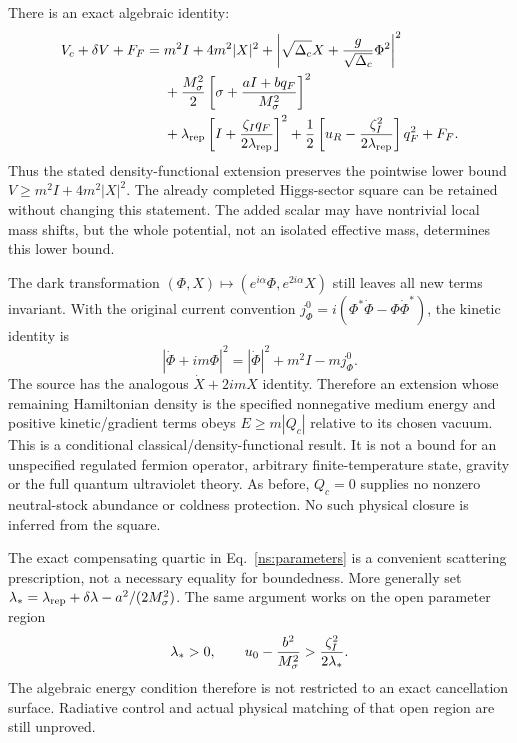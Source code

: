 \documentclass[11pt]{article}
\begin{document}
There is an exact algebraic identity:
\begin{align}
 V_c+\delta V+F_F={}&m^2I+4m^2|X|^2+
 \left|\sqrt{\Delta_c}X+{g\over\sqrt{\Delta_c}}\Phi^2\right|^2\\
 &+{M_\sigma^2\over2}
       \left[\sigma+{aI+bq_F\over M_\sigma^2}\right]^2\nonumber\\
 &+\lambda_{\rm rep}
       \left[I+{\zeta_Iq_F\over2\lambda_{\rm rep}}\right]^2
 +{1\over2}\left[u_R-{\zeta_I^2\over2\lambda_{\rm rep}}\right]q_F^2
 +F_F.\nonumber
 \label{ns:positive}
\end{align}
Thus the stated density-functional extension preserves the pointwise lower
bound $V\geq m^2I+4m^2|X|^2$. The already completed Higgs-sector square
can be retained without changing this statement. The added scalar may have
nontrivial local mass shifts, but the whole potential, not an isolated
effective mass, determines this lower bound.

The dark transformation $(\Phi,X)\mapsto(e^{i\alpha}\Phi,e^{2i\alpha}X)$
still leaves all new terms invariant. With the original current convention
$j_\Phi^0=i(\Phi^*\dot\Phi-\Phi\dot\Phi^*)$, the kinetic identity is
\begin{equation}
 |\dot\Phi+im\Phi|^2
       =|\dot\Phi|^2+m^2I-mj_\Phi^0.
\end{equation}
The source has the analogous $\dot X+2imX$ identity. Therefore an extension
whose remaining Hamiltonian density is the specified nonnegative medium
energy and positive kinetic/gradient terms obeys $E\geq m|Q_c|$ relative
to its chosen vacuum. This is a conditional classical/density-functional
result. It is not a bound for an unspecified regulated fermion operator,
arbitrary finite-temperature state, gravity or the full quantum ultraviolet
theory. As before, $Q_c=0$ supplies no nonzero neutral-stock abundance or
coldness protection. No such physical closure is inferred from the square.

The exact compensating quartic in Eq.~\eqref{ns:parameters} is a convenient
scattering prescription, not a necessary equality for boundedness. More
generally set $\lambda_*=\lambda_{\rm rep}+\delta\lambda
-a^2/(2M_\sigma^2)$. The same argument works on the open parameter region
\begin{equation}
 \lambda_*>0,\qquad
 u_0-{b^2\over M_\sigma^2}>{\zeta_I^2\over2\lambda_*}.
\end{equation}
The algebraic energy condition therefore is not restricted to an exact
cancellation surface. Radiative control and actual physical matching of
that open region are still unproved.
\end{document}
